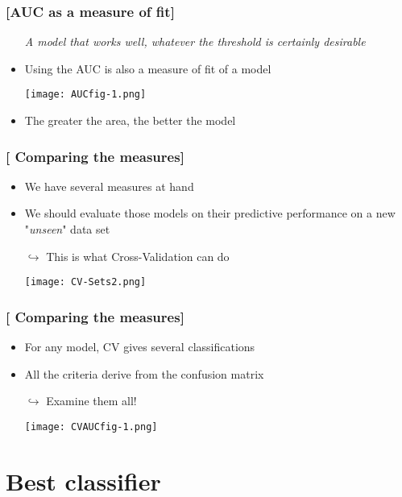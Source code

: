 \documentclass[xcolor=x11names,compress, aspectratio=169]{beamer}
\renewcommand{\(}{\begin{columns}}
\renewcommand{\)}{\end{columns}}
\newcommand{\<}[1]{\begin{column}{#1}}
\renewcommand{\>}{\end{column}}
\begin{document}
\begin{frame} %
\frametitle{\textcolor{brique}{[AUC as a measure of fit]}}
\pause
 \begin{itemize}[<+->]
  \item[] \emph{A model that works well, whatever the threshold is certainly desirable}
  \item  Using the AUC  is also a measure of fit of a model
  \item[] \begin{center}\texttt{[image: AUCfig-1.png]} \end{center}
  \item The greater the area, the better the model
\end{itemize}
\end{frame}


\begin{frame} %
\frametitle{\textcolor{brique}{[ Comparing the measures]}}
\pause
 \begin{itemize}[<+->]
  \item We have several measures at hand
  \item  We should evaluate those models on their predictive performance on a new "\textit{unseen}" data set
  \item[$\hookrightarrow$] This is what Cross-Validation can do
   \item[]\texttt{[image: CV-Sets2.png]}
\end{itemize}
\end{frame}


\begin{frame} %
\frametitle{\textcolor{brique}{[ Comparing the measures]}}
\pause
 \begin{itemize}[<+->]
  \item For any model, CV gives several classifications
  \item  All the criteria  derive from the confusion matrix
  \item[$\hookrightarrow$] Examine them all!
   \item[]\texttt{[image: CVAUCfig-1.png]}
\end{itemize}
\end{frame}


\section{Best classifier}
\end{document}
